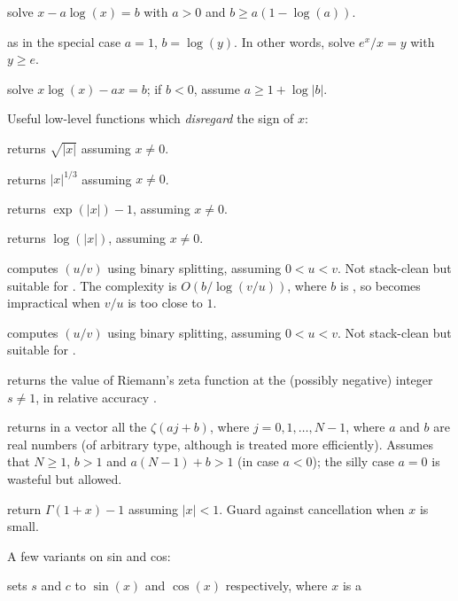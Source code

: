 solve $x - a  \log(x) = b$ with $a > 0$ and $b \geq a (1 - \log(a))$.

 as 
in the special case $a = 1$, $b = \log(y)$. In other words,
solve $e^x / x = y$ with $y \geq e$.

solve $x  \log(x) - a  x = b$; if $b < 0$, assume $a \geq 1 + \log |b|$.

\noindent Useful low-level functions which \emph{disregard} the sign of $x$:

 returns $\sqrt{|x|}$ assuming $x\neq 0$.

 returns $|x|^{1/3}$ assuming $x\neq 0$.

 returns $\exp(|x|) - 1$, assuming $x \neq 0$.

 returns $\log(|x|)$, assuming $x \neq 0$.


 computes $(u/v)$
using binary splitting, assuming $0 < u < v$. Not stack-clean but suitable
for . The complexity is $O(b / \log(v/u))$, where $b$ is
, so becomes impractical when $v/u$ is too close to
$1$.

 computes $(u/v)$
using binary splitting, assuming $0 < u < v$. Not stack-clean but suitable
for .

 returns the value of Riemann's zeta
function at the (possibly negative) integer $s\neq 1$, in relative accuracy
.

 returns in a vector
all the $\zeta(aj + b)$, where $j = 0, 1, \dots, N-1$, where $a$ and
$b$ are real numbers (of arbitrary type, although  is treated
more efficiently). Assumes that $N \geq 1$, $b > 1$ and $a(N-1) + b > 1$
(in case $a < 0$); the silly case $a = 0$ is wasteful but allowed.

 return $\Gamma(1+x) - 1$ assuming
$|x| < 1$. Guard against cancellation when $x$ is small.

\noindent A few variants on sin and cos:

 sets $s$ and $c$ to
$\sin(x)$ and $\cos(x)$ respectively, where $x$ is a 

